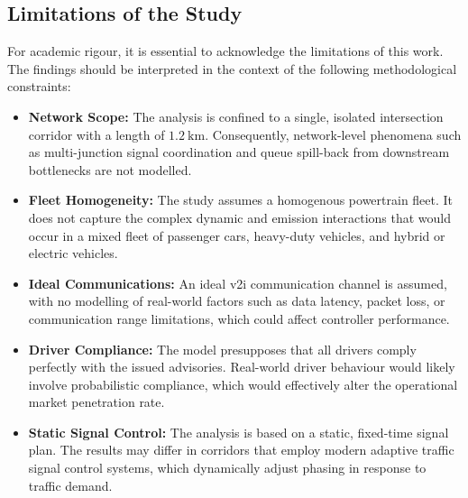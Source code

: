 \subsection*{Limitations of the Study}
For academic rigour, it is essential to acknowledge the limitations of this work. The findings should be interpreted in the context of the following methodological constraints:
\begin{itemize}
    \item \textbf{Network Scope:} The analysis is confined to a single, isolated intersection corridor with a length of $1.2~\unit{\kilo\metre}$. Consequently, network-level phenomena such as multi-junction signal coordination and queue spill-back from downstream bottlenecks are not modelled.

    \item \textbf{Fleet Homogeneity:} The study assumes a homogenous powertrain fleet. It does not capture the complex dynamic and emission interactions that would occur in a mixed fleet of passenger cars, heavy-duty vehicles, and hybrid or electric vehicles.

    \item \textbf{Ideal Communications:} An ideal \ac{v2i} communication channel is assumed, with no modelling of real-world factors such as data latency, packet loss, or communication range limitations, which could affect controller performance.

    \item \textbf{Driver Compliance:} The model presupposes that all drivers comply perfectly with the issued advisories. Real-world driver behaviour would likely involve probabilistic compliance, which would effectively alter the operational market penetration rate.

    \item \textbf{Static Signal Control:} The analysis is based on a static, fixed-time signal plan. The results may differ in corridors that employ modern adaptive traffic signal control systems, which dynamically adjust phasing in response to traffic demand.
\end{itemize}

